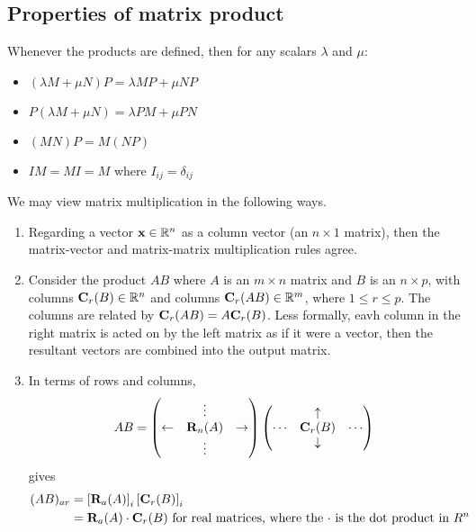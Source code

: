 \subsection{Properties of matrix product}
Whenever the products are defined, then for any scalars \(\lambda\) and \(\mu\):
\begin{itemize}
	\item \((\lambda M + \mu N)P = \lambda MP + \mu NP\)
	\item \(P(\lambda M + \mu N) = \lambda PM + \mu PN\)
	\item \((MN)P = M(NP)\)
	\item \(IM = MI = M\) where \(I_{ij} = \delta_{ij}\)
\end{itemize}
We may view matrix multiplication in the following ways.
\begin{enumerate}
	\item Regarding a vector \(\vb x \in \mathbb R^n\) as a column vector (an \(n \times 1\) matrix), then the matrix-vector and matrix-matrix multiplication rules agree.
	\item Consider the product \(AB\) where \(A\) is an \(m \times n\) matrix and \(B\) is an \(n \times p\), with columns \(\vb C_r(B) \in \mathbb R^n\) and columns \(\vb C_r(AB) \in \mathbb R^m\), where \(1 \leq r \leq p\).
	      The columns are related by \(\vb C_r(AB) = A \vb C_r(B)\).
	      Less formally, eavh column in the right matrix is acted on by the left matrix as if it were a vector, then the resultant vectors are combined into the output matrix.
	\item In terms of rows and columns,
	      \[
		      AB = \begin{pmatrix}
			                 & \vdots     &             \\
			      \leftarrow & \vb R_n(A) & \rightarrow \\
			                 & \vdots     &
		      \end{pmatrix} \begin{pmatrix}
			             & \uparrow   &        \\
			      \cdots & \vb C_r(B) & \cdots \\
			             & \downarrow &
		      \end{pmatrix}
	      \]
	      gives
	      \begin{align*}
		      (AB)_{ar} & = \left[ \vb R_a(A) \right]_i \left[ \vb C_r(B) \right]_i                                                  \\
		                & = \vb R_a(A) \cdot \vb C_r(B) \text{ for real matrices, where the \(\cdot\) is the dot product in \(R^n\)}
	      \end{align*}
\end{enumerate}


